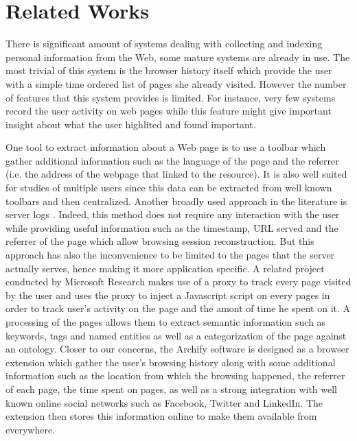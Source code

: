 \documentclass[10pt,a4paper]{article}
\begin{document}
\section{Related Works}
\label{sec:relatedWork}
There is significant amount of systems dealing with collecting and indexing personal information from the Web, some mature systems are already in use. The most trivial of this system is the browser history itself which provide the user with a simple time ordered list of pages she already visited. However the number of features that this system provides is limited. For instance, very few systems record the user activity on web pages while this feature might give important insight about what the user highlited and found important.

One tool to extract information about a Web page is to use a toolbar \cite{white2010assessing} \cite{guo2010ready} \cite{hassan2012task} \cite{kotov2011modeling} which gather additional information such as the language of the page and the referrer (i.e.  the address of the webpage that linked to the resource). It is also well suited for studies of multiple users since this data can be extracted from well known toolbars and then centralized. Another broadly used approach in the literature is server logs \cite{donato2010you} \cite{west2012human} \cite{agichtein2012search}. Indeed, this method does not require any interaction with the user while providing useful information such as the timestamp, URL served and the referrer of the page which allow browsing session reconstruction. But this approach has also the inconvenience to be limited to the pages that the server actually serves, hence making it more application specific. A related project conducted by Microsoft Research \cite{kramardetecting} makes use of a proxy to track every page visited by the user and uses the proxy to inject a Javascript script on every pages in order to track user's activity on the page and the amont of time he spent on it. A processing of the pages allows them to extract semantic information such as keywords, tags and named entities as well as a categorization of the page against an ontology. Closer to our concerns, the Archify software \cite{archify} is designed as a browser extension which gather the user's browsing history along with some additional information such as the location from which the browsing happened, the referrer of each page, the time spent on pages, as well as a strong integration with well known online social networks such as Facebook, Twitter and LinkedIn. The extension then stores this information online to make them available from everywhere.
\end{document}
